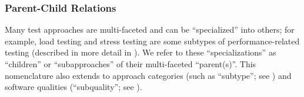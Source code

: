 
\subsubsection{Parent-Child Relations}\label{par-chd-rels}
Many test approaches are multi-faceted and can be ``specialized'' into others;
for example, load testing and stress testing are some subtypes of
performance-related testing (described in more detail in ).
We refer to these ``specializations'' as ``children'' or ``subapproaches'' of
their multi-faceted ``parent(s)''. This nomenclature also extends to approach
categories (such as ``subtype''; see ) and software
qualities (``subquality''\ifnotpaper; see \fi).

